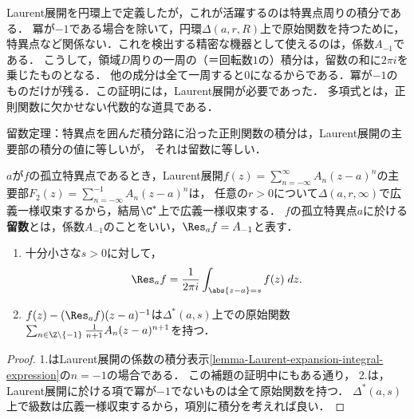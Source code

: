 \documentclass[uplatex, dvipdfmx]{jsreport}
\begin{document}
\begin{screen}
    Laurent展開を円環上で定義したが，これが活躍するのは特異点周りの積分である．
    冪が$-1$である場合を除いて，円環$\Delta(a,r,R)$上で原始関数を持つために，
    特異点など関係ない．これを検出する精密な機器として使えるのは，係数$A_{-1}$である．
    こうして，領域$D$周りの一周の（＝回転数$1$の）積分は，留数の和に$2\pi i$を乗じたものとなる．
    他の成分は全て一周すると$0$になるからである．冪が$-1$のものだけが残る．この証明には，Laurent展開が必要であった．
    多項式とは，正則関数に欠かせない代数的な道具である．

    留数定理：特異点を囲んだ積分路に沿った正則関数の積分は，Laurent展開の主要部の積分の値に等しいが，
    それは留数に等しい．
\end{screen}

\begin{definition}[residue]
    $a$が$f$の孤立特異点であるとき，Laurent展開$f(z)=\sum^\infty_{n=-\infty}A_n(z-a)^n$の主要部$F_2(z)=\sum^{-1}_{n=-\infty}A_n(z-a)^n$は，
    任意の$r>0$について$\Delta(a,r,\infty)$で広義一様収束するから，結局$\C^*$上で広義一様収束する．
    $f$の孤立特異点$a$に於ける\textbf{留数}とは，係数$A_{-1}$のことをいい，$\Res_af=A_{-1}$と表す．
\end{definition}

\begin{lemma}[留数の特徴付け]\mbox{}\label{lemma-residue-integral-expression}
    \begin{enumerate}
        \item 十分小さな$s>0$に対して，\[\Res_af=\frac{1}{2\pi i}\int_{\abs{z-a}=s}f(z)\;dz.\]
        \item $f(z)-(\Res_af)(z-a)^{-1}$は$\Delta^*(a,s)$上での原始関数$\sum_{n\in\Z\setminus\{-1\}}\frac{1}{n+1}A_n(z-a)^{n+1}$を持つ．
    \end{enumerate}
\end{lemma}
\begin{proof}
    1.はLaurent展開の係数の積分表示\ref{lemma-Laurent-expansion-integral-expression}の$n=-1$の場合である．
    この補題の証明中にもある通り，
    2.は，Laurent展開に於ける項で冪が$-1$でないものは全て原始関数を持つ．
    $\Delta^*(a,s)$上で級数は広義一様収束するから，項別に積分を考えれば良い．
\end{proof}
\end{document}
